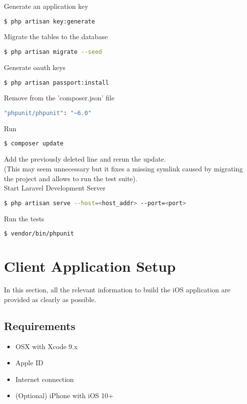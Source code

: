 \bigskip
\noindent
Generate an application key
\begin{lstlisting}[language=bash]
$ php artisan key:generate
\end{lstlisting}
Migrate the tables to the database
\begin{lstlisting}[language=bash]
$ php artisan migrate --seed
\end{lstlisting}
Generate oauth keys
\begin{lstlisting}[language=bash]
$ php artisan passport:install
\end{lstlisting}
\bigskip
Remove from the 'composer.json' file
\begin{lstlisting}[language=bash]
"phpunit/phpunit": "~6.0"
\end{lstlisting}
Run
\begin{lstlisting}[language=bash]
$ composer update
\end{lstlisting}
Add the previously deleted line and rerun the update.\\
(This may seem unnecessary but it fixes a missing symlink caused by migrating the project and allows to run the test suite).\\

\noindent Start Laravel Development Server
\begin{lstlisting}[language=bash]
$ php artisan serve --host=<host_addr> --port=<port>
\end{lstlisting}

\noindent Run the tests
\begin{lstlisting}[language=bash]
$ vendor/bin/phpunit
\end{lstlisting}

\section{Client Application Setup}
In this section, all the relevant information to build the iOS application are provided as clearly as possible.

\subsection{Requirements}

\begin{itemize}
	\item OSX with Xcode 9.x
	\item Apple ID
	\item Internet connection
	\item (Optional) iPhone with iOS 10+
\end{itemize} 

